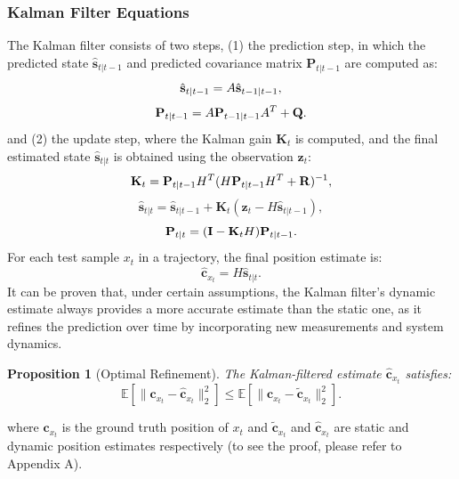 \documentclass[journal,twoside,web]{ieeecolor}
\newtheorem{proposition}{Proposition}
\begin{document}
\subsubsection{Kalman Filter Equations}
The Kalman filter consists of two steps, (1) the prediction step, in which the predicted state $\hat{\mathbf{s}}_{t|t-1}$ and predicted covariance matrix $\mathbf{P}_{t|t-1}$ are computed as:
\begin{equation}
\small
 \hat{\mathbf{s}}_{t|t-1} = A\hat{\mathbf{s}}_{t-1|t-1},
\end{equation}
\begin{equation}
\small
\mathbf{P}_{t|t-1} = A\mathbf{P}_{t-1|t-1}A^T + \mathbf{Q}.
\end{equation}
and (2) the update step, where the Kalman gain \(\mathbf{K}_t\) is computed, and the final estimated state \(\hat{\mathbf{s}}_{t|t}\) is obtained using the observation \(\mathbf{z}_t\):
\begin{equation}
\small
\mathbf{K}_t = \mathbf{P}_{t|t-1} H^T (H\mathbf{P}_{t|t-1} H^T + \mathbf{R})^{-1},
\end{equation}
\begin{equation}
\hat{\mathbf{s}}_{t|t} = \hat{\mathbf{s}}_{t|t-1} + \mathbf{K}_t (\mathbf{z}_t - H\hat{\mathbf{s}}_{t|t-1}),
\end{equation}
\begin{equation}
\small
\mathbf{P}_{t|t} = (\mathbf{I} - \mathbf{K}_t H) \mathbf{P}_{t|t-1}.
\end{equation} 
For each test sample \( x_t \) in a trajectory, the final position estimate is:
\begin{equation} 
\mathbf{\hat c}_{x_t} =H \hat{\mathbf{s}}_{t|t} .\end{equation}  
It can be proven that, under certain assumptions, the Kalman filter's dynamic estimate always provides a more accurate estimate than the static one, as it refines the prediction over time by incorporating new measurements and system dynamics.
\begin{proposition}[Optimal Refinement]  
		The Kalman-filtered estimate $\hat{\mathbf{c}}_{x_t}$ satisfies:  
		\begin{equation}
		\mathbb{E}\left[ \| \mathbf{c}_{x_t} - \hat{\mathbf{c}}_{x_t} \|_2^2 \right] \leq \mathbb{E}\left[ \| \mathbf{c}_{x_t} - \tilde{\mathbf{c}}_{x_t} \|_2^2 \right].
		\end{equation}   
\end{proposition}  
where \(\mathbf{c}_{x_t}\) is the ground truth position of $x_t$ and \(\tilde{\mathbf{c}}_{x_t}\) and \(\hat{\mathbf{c}}_{x_t}\) are static and dynamic position estimates respectively (to see the proof, please refer to Appendix A).
\end{document}

